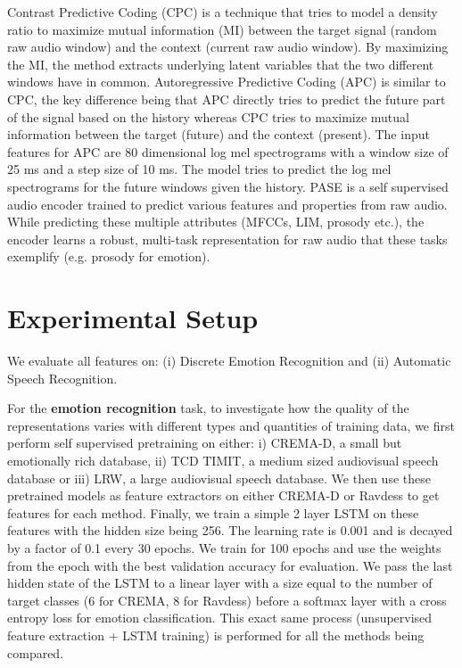 \documentclass{article}
\begin{document}
Contrast Predictive Coding (CPC) \cite{oord2018representation} is a technique that tries to model a density ratio to maximize mutual information (MI) between the target signal (random raw audio window) and the context (current raw audio window). By maximizing the MI, the method extracts underlying latent variables that the two different windows have in common. Autoregressive Predictive Coding (APC) \cite{chung2019unsupervised} is similar to CPC, the key difference being that APC directly tries to predict the future part of the signal based on the history whereas CPC tries to maximize mutual information between the target (future) and the context (present). The input features for APC are 80 dimensional log mel spectrograms with a window size of 25 ms and a step size of 10 ms. The model tries to predict the log mel spectrograms for the future windows given the history. PASE \cite{pascual2019learning} is a self supervised audio encoder trained to predict various features and properties from raw audio. While predicting these multiple attributes (MFCCs, LIM, prosody etc.), the encoder learns a robust, multi-task representation for raw audio that these tasks exemplify (e.g. prosody for emotion).

\section{Experimental Setup}
\label{sec:experiments}
We evaluate all features on: (i) Discrete Emotion Recognition and (ii) Automatic Speech Recognition.

For the \textbf{emotion recognition} task, to investigate how the quality of the representations varies with different types and quantities of training data, we first perform self supervised pretraining on either: i) CREMA-D, a small but emotionally rich database, ii) TCD TIMIT, a medium sized audiovisual speech database or iii) LRW, a large audiovisual speech database. We then use these pretrained models as feature extractors on either CREMA-D or Ravdess to get features  for each method. Finally, we train a simple 2 layer LSTM on these features with the hidden size being 256. The learning rate is 0.001 and is decayed by a factor of 0.1 every 30 epochs. We train for 100 epochs and use the weights from the epoch with the best validation accuracy for evaluation. We pass the last hidden state of the LSTM to a linear layer with a size equal to the number of target classes (6 for CREMA, 8 for Ravdess) before a softmax layer with a cross entropy loss for emotion classification. This exact same process (unsupervised feature extraction + LSTM training) is performed for all the methods being compared.
\end{document}
